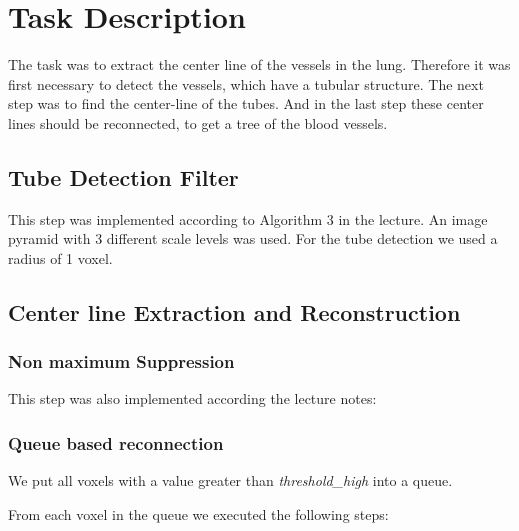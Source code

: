 \chapter{Task Description}

The task was to extract the center line of the vessels in the lung.
Therefore it was first necessary to detect the vessels, which have a tubular structure. The
next step was to find the center-line of the tubes. And in the last step
these center lines should be reconnected, to get a tree of the blood vessels.

\section{Tube Detection Filter}

This step was implemented according to Algorithm 3 in the lecture.
An image pyramid with 3 different scale levels was used.
For the tube detection we used a radius of 1 voxel.

\section{Center line Extraction and Reconstruction}

\subsection{Non maximum Suppression}

This step was also implemented according the lecture notes:

\subsection{Queue based reconnection}

We put all voxels with a value greater than \textit{threshold\_high} into a queue.

From each voxel in the queue we executed the following steps:

